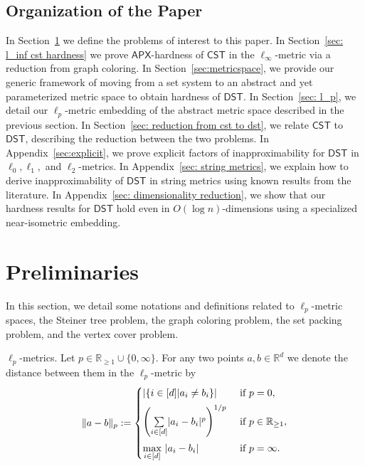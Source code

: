 \documentclass{theoretics}
\newcommand{\R}{\mathbb{R}}
\newcommand{\1}{\textbf{1}}
\newcommand{\cst}{$\mathsf{CST}$\xspace}
\newcommand{\dst}{$\mathsf{DST}$\xspace}
\newcommand{\apx}{$\mathsf{APX}$\xspace}
\newcommand{\reals}{\mathbb{R}_{\ge 1}\cup\{0,\infty\}}
\begin{document}
\subsection{Organization of the Paper}
In Section~\ref{sec:prelim} we define the problems of interest to this paper. 
In Section~\ref{sec: l_inf cst hardness} we prove \apx-hardness of \cst in the $\ell_{\infty}$-metric via a reduction from graph coloring. In Section~\ref{sec:metricspace}, we provide our generic framework of moving from a set system to an abstract and yet parameterized metric space to obtain hardness of \dst. 
In Section~\ref{sec: l_p}, we detail our $\ell_p$-metric embedding of the abstract metric space described in the previous section. 
In Section~\ref{sec: reduction from cst to dst}, we relate \cst to \dst, describing the reduction between the two problems. In Appendix~\ref{sec:explicit}, we prove explicit factors of inapproximability for \dst in $\ell_0,\ell_1,$ and $\ell_2$-metrics. In Appendix~\ref{sec: string metrics}, we explain how to derive inapproximability of \dst in string metrics using known results from the literature. In Appendix~\ref{sec: dimensionality reduction}, we show that our hardness results for \dst hold even in $O(\log n)$-dimensions using a specialized near-isometric embedding.




\section{Preliminaries}\label{sec:prelim}

In this section, we detail some notations and definitions related to $\ell_p$-metric spaces, the Steiner tree problem, the graph coloring problem, the set packing problem, and the vertex cover problem.

\begin{paragraph}{$\ell_p$-metrics.} Let $p\in \reals$. For any two points $a,b \in \R^d$ we denote the distance between them in the $\ell_p$-metric by
\[
\| a - b \|_p := \begin{cases}
\left|\{i\in[d]| a_i\neq b_i\}\right|&\text{ if }p=0,\vspace{0.15cm}\\
\left( \underset{i\in[d]}{\sum} |a_i - b_i|^p \right)^{1/p}&\text{ if }p\in\mathbb{R}_{\ge 1},\vspace{0.15cm}\\
\underset{i \in[d]}{\max}\ |a_i-b_i|&\text{ if }p=\infty.
\end{cases}
\]
\end{paragraph}
\end{document}
